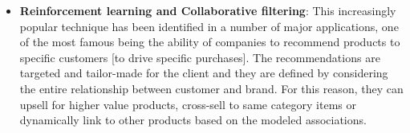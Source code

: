 \begin{itemize}
    \item \textbf{Reinforcement learning and Collaborative filtering}: This increasingly popular technique has been identified in a number of major applications, one of the most famous being the ability of companies to recommend products to specific customers [to drive specific purchases]. The recommendations are targeted and tailor-made for the client and they are defined by considering the entire relationship between customer and brand. For this reason, they can upsell for higher value products, cross-sell to same category items or dynamically link to other products based on the modeled associations.
  \end{itemize} 

